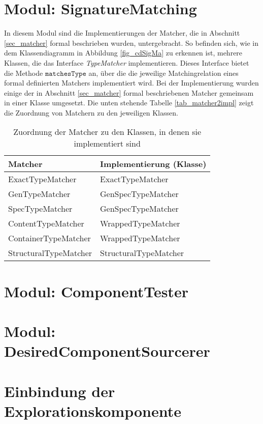 \section{Modul: SignatureMatching}
In diesem Modul sind die Implementierungen der Matcher, die in Abschnitt \ref{sec_matcher} formal beschrieben wurden, untergebracht. So befinden sich, wie in dem Klassendiagramm in Abbildung \ref{fig_cdSigMa} zu erkennen ist, mehrere Klassen, die das Interface \emph{TypeMatcher} implementieren. Dieses Interface bietet die Methode $\texttt{matchesType}$ an, über die die jeweilige Matchingrelation eines formal definierten Matchers implementiert wird. Bei der Implementierung wurden einige der in Abschnitt \ref{sec_matcher} formal beschriebenen Matcher gemeinsam in einer Klasse umgesetzt. Die unten stehende Tabelle \ref{tab_matcher2impl} zeigt die Zuordnung von Matchern zu den jeweiligen Klassen.
\begin{table}[h!]
\centering
\begin{tabular}{|l|l|}
\hline
\hline
\textbf{Matcher} & \textbf{Implementierung (Klasse)} \\
\hline
ExactTypeMatcher & ExactTypeMatcher \\
\hline
GenTypeMatcher & GenSpecTypeMatcher \\
\hline
SpecTypeMatcher & GenSpecTypeMatcher \\
\hline
ContentTypeMatcher & WrappedTypeMatcher \\
\hline
ContainerTypeMatcher & WrappedTypeMatcher \\
\hline
StructuralTypeMatcher & StructuralTypeMatcher \\
\hline
\hline
\end{tabular}
\caption{Zuordnung der Matcher zu den Klassen, in denen sie implementiert sind}
\end{table}\label{tab_matcher2impl}


\section{Modul: ComponentTester}

\section{Modul: DesiredComponentSourcerer}

\section{Einbindung der Explorationskomponente}